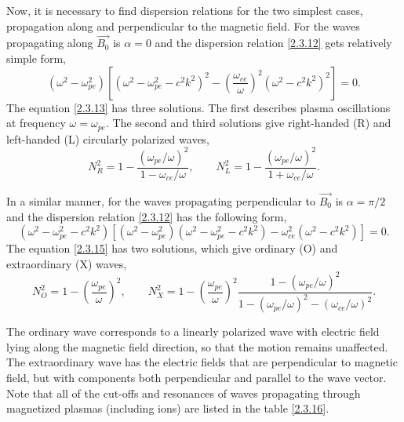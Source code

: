 Now, it is necessary to find dispersion relations for the two simplest cases, propagation along and perpendicular to the magnetic field. For the waves propagating along $ \vec{B_{0}} $ is $ \alpha = 0 $ and the dispersion relation \ref{2.3.12} gets relatively simple form,
\begin{equation}
\label{2.3.13}
\left( \omega^{2} - \omega_{pe}^{2} \right) \left[ \left( \omega^{2} - \omega_{pe}^{2} - c^{2} k^{2} \right)^{2}  - \left( \frac{\omega_{ce}}{\omega} \right)^{2} \left( \omega^{2} - c^{2} k^{2} \right)^{2} \right] = 0.
\end{equation}
The equation \ref{2.3.13} has three solutions. The first describes plasma oscillations at frequency $ \omega = \omega_{pe} $. The second and third solutions give right-handed (R) and left-handed (L) circularly polarized waves,
\begin{equation}
\label{2.3.14}
N_{R}^{2} = 1 - \frac{\left( \omega_{pe} / \omega\right)^{2} }{1 - \omega_{ce} / \omega}, \qquad N_{L}^{2} = 1 - \frac{\left( \omega_{pe} / \omega\right)^{2} }{1 + \omega_{ce} / \omega}.
\end{equation}

In a similar manner, for the waves propagating perpendicular to $ \vec{B_{0}} $ is $ \alpha = \pi/2 $ and the dispersion relation \ref{2.3.12} has the following form,
\begin{equation}
\label{2.3.15}
\left( \omega^{2} - \omega_{pe}^{2} - c^{2} k^{2} \right) \left[ \left( \omega^{2} - \omega_{pe}^{2} \right) \left( \omega^{2} - \omega_{pe}^{2} - c^{2} k^{2} \right) - \omega_{ce}^{2} \left( \omega^{2} - c^{2} k^{2} \right) \right] = 0.
\end{equation}
The equation \ref{2.3.15} has two solutions, which give ordinary (O) and extraordinary (X) waves,
\begin{equation}
N_{O}^{2} = 1 - \left( \frac{\omega_{pe}}{\omega} \right)^{2}, \qquad N_{X}^{2} = 1 - \left( \frac{\omega_{pe}}{\omega} \right)^{2} \frac{1 - \left( \omega_{pe} / \omega\right)^{2}}{1 - \left( \omega_{pe} / \omega\right)^{2} - \left( \omega_{ce} / \omega\right)^{2}}.
\end{equation}

The ordinary wave corresponds to a linearly polarized wave with electric field lying along the magnetic field direction, so that the motion remains unaffected. The extraordinary wave has the electric fields that are perpendicular to magnetic field, but with components both perpendicular and parallel to the wave vector. Note that all of the cut-offs and resonances of waves propagating through magnetized plasmas (including ions) are listed in the table \ref{2.3.16}.

